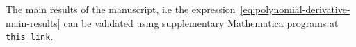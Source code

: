 ﻿The main results of the manuscript, i.e the expression~\eqref{eq:polynomial-derivative-main-results} can be validated
using supplementary Mathematica programs at
\href{https://github.com/kolosovpetro/DifferentiationOfPolynomialsViaDoubleLimit}
{\texttt{this link}}.
